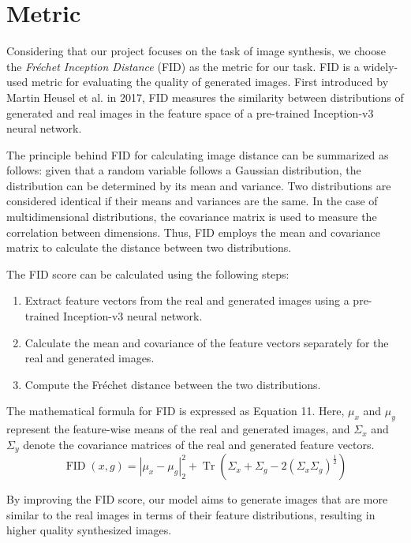 \documentclass[letterpaper]{article} %
\begin{document}
\section{Metric}
Considering that our project focuses on the task of image synthesis, we choose the \textit{Fréchet Inception Distance} (FID) as the metric for our task. FID is a widely-used metric for evaluating the quality of generated images. First introduced by Martin Heusel et al. in 2017, FID measures the similarity between distributions of generated and real images in the feature space of a pre-trained Inception-v3 neural network.

The principle behind FID for calculating image distance can be summarized as follows: given that a random variable follows a Gaussian distribution, the distribution can be determined by its mean and variance. Two distributions are considered identical if their means and variances are the same. In the case of multidimensional distributions, the covariance matrix is used to measure the correlation between dimensions. Thus, FID employs the mean and covariance matrix to calculate the distance between two distributions.

The FID score can be calculated using the following steps:
\begin{enumerate}
\item Extract feature vectors from the real and generated images using a pre-trained Inception-v3 neural network.
\item Calculate the mean and covariance of the feature vectors separately for the real and generated images.
\item Compute the Fréchet distance between the two distributions.
\end{enumerate}

The mathematical formula for FID is expressed as Equation 11. Here, $\mu_x$ and $\mu_y$ represent the feature-wise means of the real and generated images, and $\Sigma_x$ and $\Sigma_y$ denote the covariance matrices of the real and generated feature vectors.
\begin{equation}
\operatorname{FID}(x, g)=\left|\mu_x-\mu_g\right|_2^2+\operatorname{Tr}\left(\Sigma_x+\Sigma_g-2\left(\Sigma_x \Sigma_g\right)^{\frac{1}{2}}\right)
\end{equation}

By improving the FID score, our model aims to generate images that are more similar to the real images in terms of their feature distributions, resulting in higher quality synthesized images.
\end{document}
